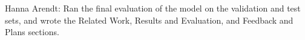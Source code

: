\documentclass[11pt]{article}
\begin{document}
Hanna Arendt: Ran the final evaluation of the model on the validation and test sets, and wrote the Related Work, Results and Evaluation, and Feedback and Plans sections.


%





\newpage

\end{document}
